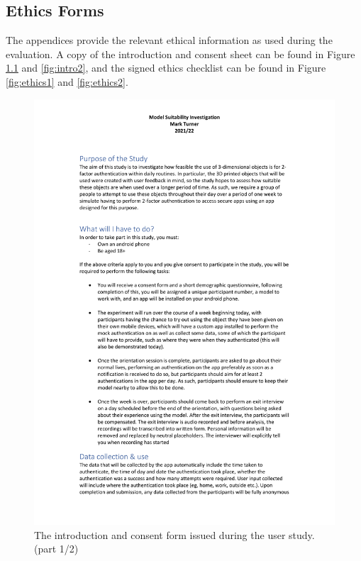 \documentclass{l4proj}
\begin{document}
\begin{appendices}

\chapter{Ethics Forms}

The appendices provide the relevant ethical information as used during the evaluation. A copy of the introduction and consent sheet can be found in Figure \ref{fig:intro1} and \ref{fig:intro2}, and the signed ethics checklist can be found in Figure \ref{fig:ethics1} and \ref{fig:ethics2}.


\begin{figure}
    \includegraphics[page=1,width=\linewidth]{Appendices/introduction_script_and_consent_form.pdf}
    \caption{The introduction and consent form issued during the user study. (part 1/2)}
    \label{fig:intro1}
\end{figure}


\end{appendices}
\end{document}
